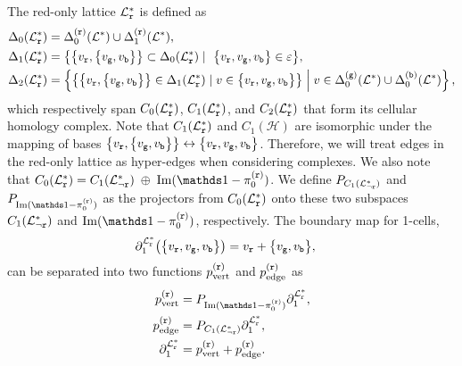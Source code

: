 \documentclass[a4paper,twocolumn,11pt,accepted=2025-01-21]{quantumarticle}
\theoremstyle{definition}
\theoremstyle{definition}
\theoremstyle{definition}
\begin{document}
The red-only lattice $\LatticeMono{\rbs}$ is defined as
\begin{align*}
    \Delta_0\qty(\LatticeMono{\rbs}) &= \latelmcolor{\mathcal{L}^*}{0}{\rbs} \cup \latelmcolor{\mathcal{L}^*}{1}{\rbs}, \\
    \Delta_1\qty(\LatticeMono{\rbs}) &= \qty{\qty{v_\rbs,\qty{v_\gbs,v_\bbs}} \subset \Delta_0\qty(\LatticeMono{\rbs}) \;\vert\;\ \qty{v_\rbs,v_\gbs,v_\bbs} \in \varepsilon}, \\
    \Delta_2\qty(\LatticeMono{\rbs}) &= \left\{ \qty{ \qty{v_\rbs,\qty{v_\gbs,v_\bbs}} \in \Delta_1\qty(\LatticeMono{\rbs}) \;\vert\; v \in \qty{v_\rbs,v_\gbs,v_\bbs}} \;\middle\vert\; v \in \latelmcolor{\mathcal{L}^*}{0}{\gbs} \cup \latelmcolor{\mathcal{L}^*}{0}{\bbs}\right\}, \\
\end{align*}
which respectively span $C_0\qty(\LatticeMono{\rbs})$, $C_1\qty(\LatticeMono{\rbs})$, and $C_2\qty(\LatticeMono{\rbs})$ that form its cellular homology complex.
Note that $C_1(\LatticeMono{\rbs})$ and $C_1(\mathcal{H})$ are isomorphic under the mapping of bases $\qty{v_\rbs,\qty{v_\gbs,v_\bbs}} \leftrightarrow \qty{v_\rbs,v_\gbs,v_\bbs}$.
Therefore, we will treat edges in the red-only lattice as hyper-edges when considering complexes.
We also note that $C_0(\LatticeMono{\rbs}) = C_1(\LatticeRest{\rbs}) \;\oplus\; \Im(\identity - \pi^{(\rbs)}_0)$.
We define $P_{C_1(\LatticeRest{\rbs})}$ and $P_{\Im(\identity - \pi_0^{(\rbs)})}$ as the projectors from $C_0(\LatticeMono{\rbs})$ onto these two subspaces $C_1(\LatticeRest{\rbs})$ and $\Im(\identity - \pi_0^{(\rbs)})$, respectively.
The boundary map for 1-cells,
\begin{align*}
\partial_1^{\LatticeMono{\rbs}}\qty(\qty{v_\rbs,v_\gbs,v_\bbs}) &= v_\rbs + \qty{v_\gbs,v_\bbs},
\end{align*}
can be separated into two functions $p_\mr{vert}^{(\rbs)}$ and $p_\mr{edge}^{(\rbs)}$ as
\begin{subequations}
\begin{align}
    p_\mr{vert}^{(\rbs)} &= P_{\Im(\identity - \pi_0^{(\rbs)})}\partial_1^{\LatticeMono{\rbs}}, \\
    p_\mr{edge}^{(\rbs)} &= P_{C_1(\LatticeRest{\rbs})}\partial_1^{\LatticeMono{\rbs}}, \\
    \partial_1^{\LatticeMono{\rbs}} &= p_\mr{vert}^{(\rbs)} + p_\mr{edge}^{(\rbs)}. \nonumber
\end{align}
\label{eq:projected_boundary_maps}%
\end{subequations}
\end{document}
